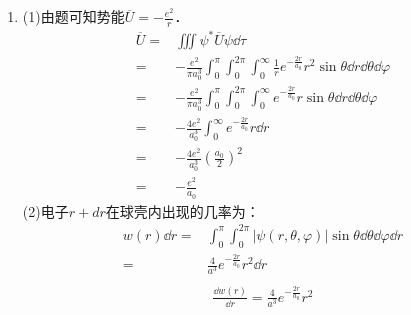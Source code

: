 
\begin{issues}
\issueDraft
\end{issues}


\subsection{ }
\begin{enumerate}
\item 
(1)由题可知势能$\overline{U}=-\frac{e^2}{r}$．
\begin{equation}
\begin{aligned}
\overline{U}=&\iiint \psi^{*} \overline{U} \psi \dd{\tau}\\
=&-\frac{e^2}{\pi a^{3}_{0}}\int^{\pi}_{0}\int^{2\pi}_{0}\int^{\infty}_{0} \frac{1}{r}e^{-\frac{2r}{a_0}}r^{2}\sin{\theta} \dd{r}\dd{\theta}\dd{\varphi}\\
=&-\frac{e^{2}}{\pi a^{3}_{0}}\int^{\pi}_{0}\int^{2\pi}_{0}\int^{\infty}_{0} e^{-\frac{2r}{a_0}}r\sin{\theta} \dd{r}\dd{\theta}\dd{\varphi}\\
=&-\frac{4 e^2}{a^{3}_{0}}\int^{\infty}_{0}e^{-\frac{2r}{a_0}}r\dd{r}\\
=&-\frac{4e^{2}}{a^{3}_{0}}(\frac{a_{0}}{2})^2\\
=&-\frac{e^{2}}{a_{0}}
\end{aligned}
\end{equation}
(2)电子$r+dr$在球壳内出现的几率为：\\
\begin{equation}
\begin{aligned}
w(r)\dd{r}=&\int^{\pi}_{0}\int^{2\pi}_{0} \lvert \psi(r,\theta,\varphi) \rvert \sin{\theta}\dd{\theta}\dd{\varphi}\dd{r}\\
=&\frac{4}{a^{3}}e^{-\frac{2r}{a_0}}r^2 \dd{r}\\
\end{aligned}
\end{equation}
\begin{equation}
\begin{aligned}
\frac{\dd{w(r)}}{\dd{r}}=\frac{4}{a^{3}}e^{-\frac{2r}{a_0}}r^2 
\end{aligned}
\end{equation}

\end{enumerate}